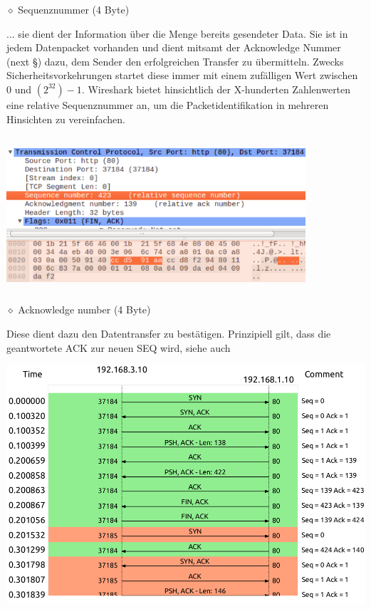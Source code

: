 \documentclass[11pt]{article}
\begin{document}
\begin{enumerate}[\thesection .1]
        $\diamond$ Sequenznummer (4 Byte)
        \begin{addmargin}[1em]{1em}
            ... sie dient der Information über die Menge bereits gesendeter Data. Sie ist in jedem Datenpacket vorhanden und
            dient mitsamt der Acknowledge Nummer (next §) dazu, dem Sender den erfolgreichen Transfer zu übermitteln. Zwecks Sicherheitsvorkehrungen startet diese immer
            mit einem zufälligen Wert zwischen 0 und $(2^32)-1$. Wireshark bietet hinsichtlich der X-hunderten Zahlenwerten eine relative
            Sequenznummer an, um die Packetidentifikation in mehreren Hinsichten zu vereinfachen.\\\\
            \includegraphics[width=30em, height=15em]{SequenceNumber.png}
        \end{addmargin}
        $\diamond$ Acknowledge number (4 Byte)
        \begin{addmargin}[1em]{1em}
            Diese dient dazu den Datentransfer zu bestätigen.
            Prinzipiell gilt, dass die geantwortete ACK zur neuen SEQ wird, siehe auch
            \begin{center}
                \includegraphics[width=\textwidth]{SeqAckFlowgraph.png}
            \end{center}


\end{addmargin}
\end{enumerate}
\end{document}
